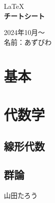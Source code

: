 \documentclass[11pt,a4j]{jreport}
\begin{document}

\thispagestyle{empty}
\begin{center}

\vspace{20mm}
{\Large\noindent LaTeX}\\
\vspace{40mm}
{\huge\noindent\textbf{チートシート}}\\
\medskip
\vspace{\baselineskip}
\vspace{30mm}

{\Large\noindent
2024年10月〜\\
\vspace{\baselineskip}
名前：あずびわ\\
}
\vspace{40mm}

\end{center}

\thispagestyle{empty}
\clearpage


\tableofcontents
\thispagestyle{fancy}
\pagestyle{fancy}
\lhead{\rightmark}
\renewcommand{\chaptermark}[1]{\markboth{第\ \normalfont\thechapter\ 章~~#1}{}}
\thispagestyle{fancy}
\chapter{基本}
\thispagestyle{fancy}

\chapter{代数学}
\thispagestyle{fancy}
\section{線形代数}

\section{群論}



\renewcommand{\bibname}{参考文献}
\begin{thebibliography}{99}
\end{thebibliography}
山田たろう
\end{document}
